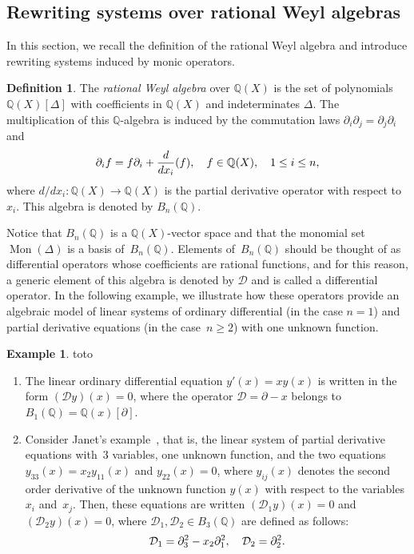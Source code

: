 \documentclass[11pt]{article}
\theoremstyle{definition}
\newtheorem{definition}[theorem]{Definition}
\newtheorem{example}[theorem]{Example}
\newcommand\diff[1]{\partial_{#1}}
\newcommand\D{\mathcal{D}}
\newcommand\Q{\mathbb{Q}}
\newcommand\Weyl[1]{B_{#1}(\Q)}
\newcommand\monBasis{\Mon(\Delta)}
\DeclareMathOperator{\Mon}{Mon}
\begin{document}
\subsection{Rewriting systems over rational Weyl algebras}
\label{sec:rewriting_systems_over_Weyl_algebras}

In this section, we recall the definition of the rational Weyl algebra
and introduce rewriting systems induced by monic operators.
\medskip

\begin{definition}
  The {\it rational Weyl algebra} over $\Q(X)$ is the set of polynomials
  $\Q(X)[\Delta]$ with coefficients in $\Q(X)$ and indeterminates
  $\Delta$. The multiplication of this $\mathbb Q$-algebra is induced by
  the commutation laws $\partial_i\partial_j=\partial_j\partial_i$ and
  \[\diff{i}f=f\diff{i}+\frac{d}{dx_i}(f),\quad f\in\Q(X),\quad
  1\leq i\leq n,
  \smallskip\]
  where $d/dx_i:\Q(X)\to\Q(X)$ is the partial derivative operator with
  respect to~$x_i$. This algebra is denoted by $\Weyl{n}$.
\end{definition}
\smallskip

Notice that $\Weyl{n}$ is a $\Q(X)$-vector space and that the monomial 
set $\monBasis$ is a basis of~$\Weyl{n}$. Elements of~$\Weyl{n}$ should 
be thought of as differential operators whose coefficients are rational
functions, and for this reason, a generic element of this algebra is
denoted by $\D$ and is called a differential operator. In the following
example, we illustrate how these operators provide an algebraic model of
linear systems of ordinary differential (in the case $n=1$) and partial
derivative equations (in the case~$n\geq 2$) with one unknown function. 
\smallskip

\begin{example}\label{ex:diff_operators_init}
  {\color{white}toto}
  \begin{enumerate}
  \item\label{it:ODE_init} The linear ordinary differential equation
    $y'(x)=xy(x)$ is written in the form $(\D y)(x)=0$, where the operator
    $\D=\partial-x$ belongs to $\Weyl{1}=\Q(x)[\partial]$. 
  \item\label{it:Janet_example_init} Consider Janet's
    example~\cite{MR1308976}, that is, the linear system of partial
    derivative equations with~$3$ variables, one unknown function, and
    the two equations $y_{33}(x)=x_2y_{11}(x)$ and $y_{22}(x)=0$, where
    $y_{ij}(x)$ denotes the second order derivative of the unknown
    function $y(x)$ with respect to the variables $x_i$ and~$x_j$. Then,
    these equations are written $(\D_1y)(x)=0$ and $(\D_2y)(x)=0$, where
    $\D_1,\D_2\in\Weyl{3}$ are defined as follows:
    \[\D_1=\partial_3^2-x_2\partial_1^2,\quad \D_2=\partial_2^2.
    \smallskip\]
  \end{enumerate}
\end{example}
\end{document}
